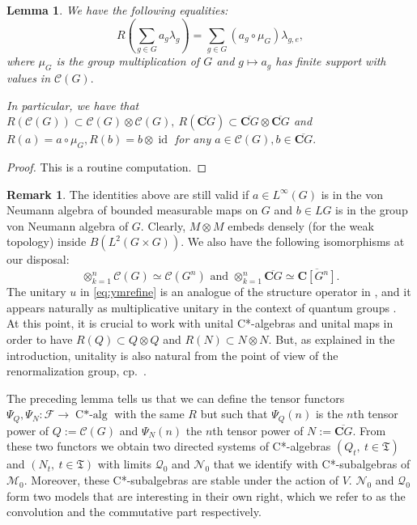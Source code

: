 \documentclass[a4paper,12pt]{amsart}
\numberwithin{equation}{section}
\newtheorem{lemma}[theo]{Lemma}
\theoremstyle{definition}
\newtheorem{remark}[theo]{Remark}
\DeclareMathOperator{\id}{id}
\DeclareMathOperator{\Calg}{C*-alg}
\newcommand{\scrC}{\mathscr C}
\newcommand{\C}{\mathbf C}
\newcommand{\cF}{\mathcal F}
\newcommand{\la}{\lambda}
\newcommand{\scrM}{\mathscr M}
\newcommand{\scrN}{\mathscr N}
\newcommand{\ot}{\otimes}\newcommand{\otmin}{\otimes_{\text{min}}}
\newcommand{\scrQ}{\mathscr Q}
\newcommand{\fT}{\mathfrak T}
\begin{document}
\begin{lemma}\label{lem:R}
We have the following equalities:
\begin{equation}
\label{eq:ymrefine}
R(\sum_{g\in G} a_g \la_g) = \sum_{g\in G} ( a_g\circ \mu_G) \la_{g,e},
\end{equation}
where $\mu_G$ is the group multiplication of $G$ and $g\mapsto a_g$ has finite support with values in $\scrC(G).$

In particular, we have that $R(\scrC(G))\subset \scrC(G)\ot \scrC(G), \ R(\overline{\C G})\subset \overline{\C G}\ot \overline{\C G}$ and $R(a)=a\circ\mu_G, R(b) = b\ot \id$ for any $a\in\scrC(G), b\in \overline{\C G}.$
\end{lemma}

\begin{proof}
This is a routine computation.
\end{proof}

\begin{remark}
The identities above are still valid if $a\in L^\infty(G)$ is in the von Neumann algebra of bounded measurable maps on $G$ and $b\in LG$ is in the group von Neumann algebra of $G$. 
Clearly, $M\ot M$ embeds densely (for the weak topology) inside $B(L^2(G\times G))$. 
We also have the following isomorphisms at our disposal: 
$$\otimes_{k=1}^n \scrC(G)\simeq \scrC(G^n) \text{ and } \ot_{k=1}^n \overline{\C G}\simeq \overline{ \C [G^n]  }.$$ 
The unitary $u$ in \eqref{eq:ymrefine} is an analogue of the structure operator in \cite{TakesakiII}, and it appears naturally as multiplicative unitary in the context of quantum groups \cite{Timmermann-08-Quantum-Groups}. \\[0.1cm]
At this point, it is crucial to work with unital C*-algebras and unital maps in order to have $R(Q)\subset Q\ot Q$ and $R(N)\subset N\ot N$. But, as explained in the introduction, unitality is also natural from the point of view of the renormalization group, cp.~{\cite[Section 4]{Brot-Stottmeister-Phys}}.
\end{remark}

The preceding lemma tells us that we can define the tensor functors $\Psi_Q,\Psi_N:\cF\to\Calg$ with the same $R$ but such that $\Psi_Q(n)$ is the $n$th tensor power of $Q:=\scrC(G)$ and $\Psi_N(n)$ the $n$th tensor power of $N:=\overline{\C G}$.
From these two functors we obtain two directed systems of C*-algebras $(Q_t,  \ t\in\fT)$ and $(N_t,  \ t\in\fT)$ with limits $\scrQ_0$ and $\scrN_0$ that we identify with C*-subalgebras of $\scrM_0$.
Moreover, these C*-subalgebras are stable under the action of $V.$
$\scrN_0$ and $\scrQ_0$ form two models that are interesting in their own right, which we refer to as the convolution and the commutative part respectively.
\end{document}
